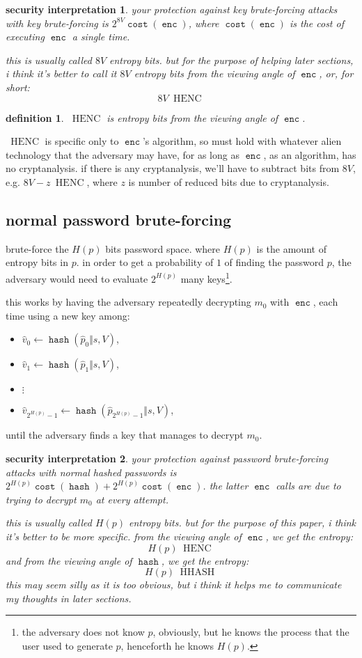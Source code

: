 \documentclass[twocolumn]{article}
\newtheorem{security}{security interpretation}
\newtheorem{definition}{definition}
\DeclareMathOperator{\enc}{\mathtt{enc}}
\DeclareMathOperator{\hash}{\mathtt{hash}}
\DeclareMathOperator{\cost}{\mathtt{cost}}
\DeclareMathOperator{\henc}{\; HENC}
\DeclareMathOperator{\hhash}{\; HHASH}
\begin{document}
\begin{security}
your protection against key brute-forcing attacks with key brute-forcing is
$2^{8V} \cost(\enc)$, where $\cost(\enc)$ is the cost of executing $\enc$ a
single time.  

this is usually called $8V$ \emph{entropy bits}.  but for the purpose of
helping later sections, i think it's better to call it $8V$ \emph{entropy
bits from the viewing angle of $\enc$}, or, for short:
\[
    8V \henc
\]
\end{security}

\begin{definition}
$\henc$ is entropy bits from the viewing angle of $\enc$.
\end{definition}

$\henc$  is specific only to $\enc$'s algorithm, so must hold with whatever
alien technology that the adversary may have, for as long as $\enc$, as an
algorithm, has no cryptanalysis.  if there is any cryptanalysis, we'll have
to subtract bits from $8V$, e.g. $8V
- z \henc$, where $z$ is number of reduced bits due to cryptanalysis.

\subsection{normal password brute-forcing}
brute-force the $H(p)$ bits password space.  where $H(p)$ is the amount of
entropy bits in $p$.  in order to get a probability of $1$ of finding the
password $p$, the adversary would need to evaluate $2^{H(p)}$ many
keys\footnote{the adversary does not know $p$, obviously, but he knows the
process that the user used to generate $p$, henceforth he knows $H(p)$.}.

this works by having the adversary repeatedly decrypting $m_0$ with $\enc$,
each time using a new key among:
\begin{itemize}
    \item $\hat v_0 \gets \hash(\hat p_0 \Vert s, V)$,
    \item $\hat v_1 \gets \hash(\hat p_1 \Vert s, V)$,
    \item $\vdots$
    \item $\hat v_{2^{H(p)}-1} \gets \hash(\hat p_{2^{H(p)}-1} \Vert s,
    V)$,
\end{itemize}
until the adversary finds a key that manages to decrypt $m_0$.

\begin{security}
your protection against password brute-forcing attacks with normal hashed
passwords is $2^{H(p)} \cost(\hash) + 2^{H(p)} \cost(\enc)$.  the latter
$\enc$ calls are due to trying to decrypt $m_0$ at every attempt.

this is usually called $H(p)$ \emph{entropy bits}.  but for the purpose of
this paper, i think it's better to be more specific.  from the viewing
angle of $\enc$, we get the entropy:
\[
    H(p) \henc
\]
and from the viewing angle of $\hash$, we get the entropy:
\[
    H(p) \hhash
\]
this may seem silly as it is too obvious, but i think it helps me to
communicate my thoughts in later sections.
\end{security}
\end{document}
